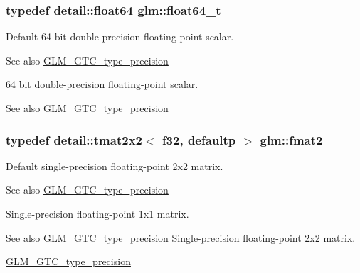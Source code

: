 \subsubsection[{\texorpdfstring{float64\+\_\+t}{float64_t}}]{\setlength{\rightskip}{0pt plus 5cm}typedef detail\+::float64 {\bf glm\+::float64\+\_\+t}}\hypertarget{group__gtc__type__precision_gade966a3eb25ebeb16dd53c40d3fdeb46}{}\label{group__gtc__type__precision_gade966a3eb25ebeb16dd53c40d3fdeb46}
Default 64 bit double-\/precision floating-\/point scalar. \begin{DoxySeeAlso}{See also}
\hyperlink{group__gtc__type__precision}{G\+L\+M\+\_\+\+G\+T\+C\+\_\+type\+\_\+precision}
\end{DoxySeeAlso}
64 bit double-\/precision floating-\/point scalar. \begin{DoxySeeAlso}{See also}
\hyperlink{group__gtc__type__precision}{G\+L\+M\+\_\+\+G\+T\+C\+\_\+type\+\_\+precision} 
\end{DoxySeeAlso}
\subsubsection[{\texorpdfstring{fmat2}{fmat2}}]{\setlength{\rightskip}{0pt plus 5cm}typedef detail\+::tmat2x2$<$ f32, defaultp $>$ {\bf glm\+::fmat2}}\hypertarget{group__gtc__type__precision_ga96b15c5eaecce87b352dab5d373da979}{}\label{group__gtc__type__precision_ga96b15c5eaecce87b352dab5d373da979}
Default single-\/precision floating-\/point 2x2 matrix. \begin{DoxySeeAlso}{See also}
\hyperlink{group__gtc__type__precision}{G\+L\+M\+\_\+\+G\+T\+C\+\_\+type\+\_\+precision}
\end{DoxySeeAlso}
Single-\/precision floating-\/point 1x1 matrix. \begin{DoxySeeAlso}{See also}
\hyperlink{group__gtc__type__precision}{G\+L\+M\+\_\+\+G\+T\+C\+\_\+type\+\_\+precision} Single-\/precision floating-\/point 2x2 matrix. 

\hyperlink{group__gtc__type__precision}{G\+L\+M\+\_\+\+G\+T\+C\+\_\+type\+\_\+precision} 
\end{DoxySeeAlso}
